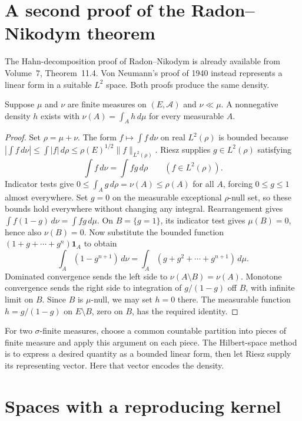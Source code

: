 \section{A second proof of the Radon--Nikodym theorem}

The Hahn-decomposition proof of Radon--Nikodym is already available from Volume~7, Theorem~11.4. Von Neumann's proof of 1940 instead represents a linear form in a suitable $L^2$ space. Both proofs produce the same density.

\begin{theorem}\label{thm:rnvn}
Suppose $\mu$ and $\nu$ are finite measures on $(E,\mathcal A)$ and $\nu\ll\mu$. A nonnegative density $h$ exists with $\nu(A)=\int_Ah\,d\mu$ for every measurable $A$.
\end{theorem}
\begin{proof}
Set $\rho=\mu+\nu$. The form $f\mapsto\int f\,d\nu$ on real $L^2(\rho)$ is bounded because $|\int f\,d\nu|\le\int|f|\,d\rho\le\rho(E)^{1/2}\|f\|_{L^2(\rho)}$. Riesz supplies $g\in L^2(\rho)$ satisfying
\[\int f\,d\nu=\int fg\,d\rho\qquad(f\in L^2(\rho)).\]
Indicator tests give $0\le\int_Ag\,d\rho=\nu(A)\le\rho(A)$ for all $A$, forcing $0\le g\le1$ almost everywhere. Set $g=0$ on the measurable exceptional $\rho$-null set, so these bounds hold everywhere without changing any integral. Rearrangement gives $\int f(1-g)\,d\nu=\int fg\,d\mu$. On $B=\{g=1\}$, its indicator test gives $\mu(B)=0$, hence also $\nu(B)=0$. Now substitute the bounded function $(1+g+\cdots+g^n)\mathbf 1_A$ to obtain
\[\int_A(1-g^{n+1})\,d\nu=\int_A(g+g^2+\cdots+g^{n+1})\,d\mu.\]
Dominated convergence sends the left side to $\nu(A\setminus B)=\nu(A)$. Monotone convergence sends the right side to integration of $g/(1-g)$ off $B$, with infinite limit on $B$. Since $B$ is $\mu$-null, we may set $h=0$ there. The measurable function $h=g/(1-g)$ on $E\setminus B$, zero on $B$, has the required identity.
\end{proof}

For two $\sigma$-finite measures, choose a common countable partition into pieces of finite measure and apply this argument on each piece. The Hilbert-space method is to express a desired quantity as a bounded linear form, then let Riesz supply its representing vector. Here that vector encodes the density.

\section{Spaces with a reproducing kernel}

